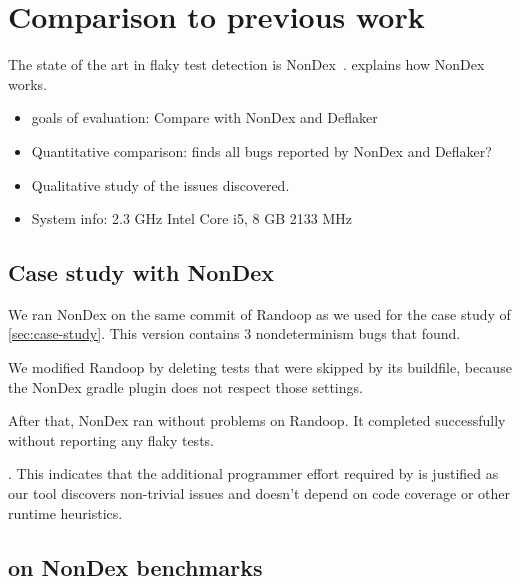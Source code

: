 \section{Comparison to previous work}

The state of the art in flaky test detection is NonDex~\cite{nondex}.
 explains how NonDex works.



\begin{itemize}
    \item goals of evaluation: Compare with NonDex and Deflaker
    \item Quantitative comparison: \TheDeterminismChecker finds all bugs reported by NonDex and Deflaker?
    \item Qualitative study of the issues discovered.
    \item System info: 2.3 GHz Intel Core i5, 8 GB 2133 MHz
\end{itemize}


\subsection{Case study with NonDex}\label{sec:nondex-randoop}

We ran NonDex on the same commit of Randoop as we used for the case study
of \cref{sec:case-study}.  This version contains 3 nondeterminism bugs that
\theDeterminismChecker found.

We modified Randoop by deleting tests that were skipped by its buildfile,
because the NonDex gradle plugin does not respect those settings.

After that, NonDex ran without problems on Randoop.
It completed successfully without reporting any flaky tests.


.
This indicates that the additional programmer effort required by \TheDeterminismChecker is justified
as our tool discovers non-trivial issues and doesn't depend on code coverage or other runtime heuristics.

\subsection{\TheDeterminismChecker on NonDex benchmarks}\label{sec:nondex-benchmarks}

